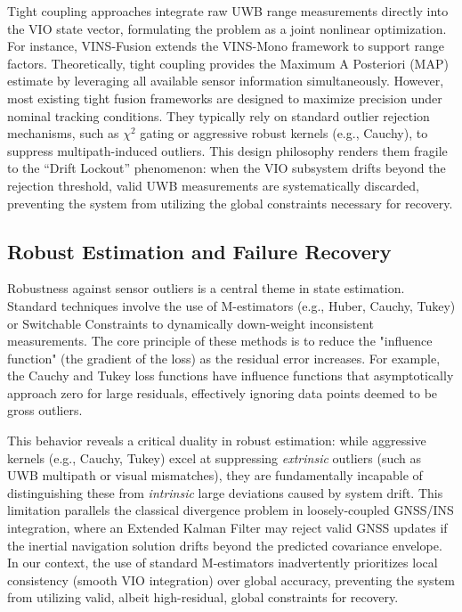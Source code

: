 \documentclass{svproc}
\begin{document}
Tight coupling approaches \cite{nguyen2021ntu,he2020tightly} integrate raw UWB range measurements directly into the VIO state vector, formulating the problem as a joint nonlinear optimization. For instance, VINS-Fusion \cite{qin2019general} extends the VINS-Mono framework to support range factors. Theoretically, tight coupling provides the Maximum A Posteriori (MAP) estimate by leveraging all available sensor information simultaneously. However, most existing tight fusion frameworks are designed to maximize precision under nominal tracking conditions. They typically rely on standard outlier rejection mechanisms, such as $\chi^2$ gating or aggressive robust kernels (e.g., Cauchy), to suppress multipath-induced outliers. This design philosophy renders them fragile to the ``Drift Lockout'' phenomenon: when the VIO subsystem drifts beyond the rejection threshold, valid UWB measurements are systematically discarded, preventing the system from utilizing the global constraints necessary for recovery.

\subsection{Robust Estimation and Failure Recovery}

Robustness against sensor outliers is a central theme in state estimation. Standard techniques involve the use of M-estimators (e.g., Huber, Cauchy, Tukey) \cite{zhang1997parameter} or Switchable Constraints \cite{sunderhauf2012switchable} to dynamically down-weight inconsistent measurements. The core principle of these methods is to reduce the "influence function" (the gradient of the loss) as the residual error increases. For example, the Cauchy and Tukey loss functions have influence functions that asymptotically approach zero for large residuals, effectively ignoring data points deemed to be gross outliers.

This behavior reveals a critical duality in robust estimation: while aggressive kernels (e.g., Cauchy, Tukey) excel at suppressing \textit{extrinsic} outliers (such as UWB multipath or visual mismatches), they are fundamentally incapable of distinguishing these from \textit{intrinsic} large deviations caused by system drift. This limitation parallels the classical divergence problem in loosely-coupled GNSS/INS integration, where an Extended Kalman Filter may reject valid GNSS updates if the inertial navigation solution drifts beyond the predicted covariance envelope. In our context, the use of standard M-estimators inadvertently prioritizes local consistency (smooth VIO integration) over global accuracy, preventing the system from utilizing valid, albeit high-residual, global constraints for recovery.
\end{document}
